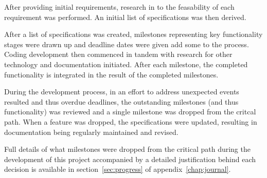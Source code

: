 After providing initial requirements, research in to the feasability of
each requirement was performed. An initial list of specifications was
then derived.


After a list of specifications was created, milestones representing key
functionality stages were drawn up and deadline dates were given add
some to  the process. Coding development then commenced in tandem with 
research for other technology and documentation initiated. After each
milestone, the completed functionality is integrated in the result of
the completed milestones.


During the development process, in an effort to address unexpected 
events resulted and thus overdue deadlines, the outstanding milestones 
(and thus functionality) was reviewed and a single milestone was 
dropped from the critcal path. When a feature was dropped, the 
specifications were updated, resulting in documentation being regularly 
maintained and revised.


Full details of what milestones were dropped from the critical path
during the development of this project accompanied by a detailed
justification behind each decision is available in 
section~\ref{sec:progress} of appendix~\ref{chap:journal}.
